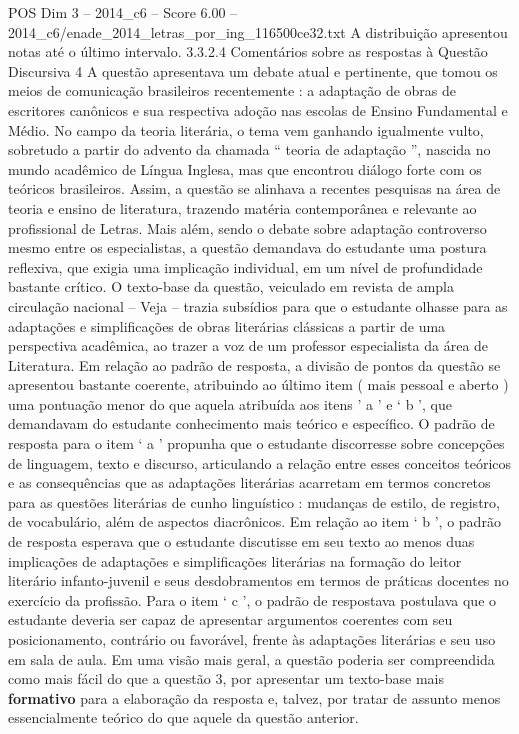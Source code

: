\begin{textsample}{POS Dim 3 – 2014\_c6 – Score 6.00 – 2014\_c6/enade\_2014\_letras\_por\_ing\_116500ce32.txt}
A distribuição apresentou notas até o último intervalo. 3.3.2.4 Comentários sobre as respostas à Questão Discursiva 4 A questão apresentava um debate atual e pertinente, que tomou os meios de comunicação brasileiros recentemente : a adaptação de obras de escritores canônicos e sua respectiva adoção nas escolas de Ensino Fundamental e Médio.
No campo da teoria literária, o tema vem ganhando igualmente vulto, sobretudo a partir do advento da chamada “ teoria de adaptação ”, nascida no mundo acadêmico de Língua Inglesa, mas que encontrou diálogo forte com os teóricos brasileiros.
Assim, a questão se alinhava a recentes pesquisas na área de teoria e ensino de literatura, trazendo matéria contemporânea e relevante ao profissional de Letras.
Mais além, sendo o debate sobre adaptação controverso mesmo entre os especialistas, a questão demandava do estudante uma postura reflexiva, que exigia uma implicação individual, em um nível de profundidade bastante crítico.
O texto-base da questão, veiculado em revista de ampla circulação nacional – Veja – trazia subsídios para que o estudante olhasse para as adaptações e simplificações de obras literárias clássicas a partir de uma perspectiva acadêmica, ao trazer a voz de um professor especialista da área de Literatura.
Em relação ao padrão de resposta, a divisão de pontos da questão se apresentou bastante coerente, atribuindo ao último item ( mais pessoal e aberto ) uma pontuação menor do que aquela atribuída aos itens ’ a ’ e ‘ b ’, que demandavam do estudante conhecimento mais teórico e específico.
O padrão de resposta para o item ‘ a ’ propunha que o estudante discorresse sobre concepções de linguagem, texto e discurso, articulando a relação entre esses conceitos teóricos e as consequências que as adaptações literárias acarretam em termos concretos para as questões literárias de cunho linguístico : mudanças de estilo, de registro, de vocabulário, além de aspectos diacrônicos.
Em relação ao item ‘ b ’, o padrão de resposta esperava que o estudante discutisse em seu texto ao menos duas implicações de adaptações e simplificações literárias na formação do leitor literário infanto-juvenil e seus desdobramentos em termos de práticas docentes no exercício da profissão.
Para o item ‘ c ’, o padrão de respostava postulava que o estudante deveria ser capaz de apresentar argumentos coerentes com seu posicionamento, contrário ou favorável, frente às adaptações literárias e seu uso em sala de aula.
Em uma visão mais geral, a questão poderia ser compreendida como mais fácil do que a questão 3, por apresentar um texto-base mais \textbf{formativo} para a elaboração da resposta e, talvez, por tratar de assunto menos essencialmente teórico do que aquele da questão anterior.

\end{textsample}
